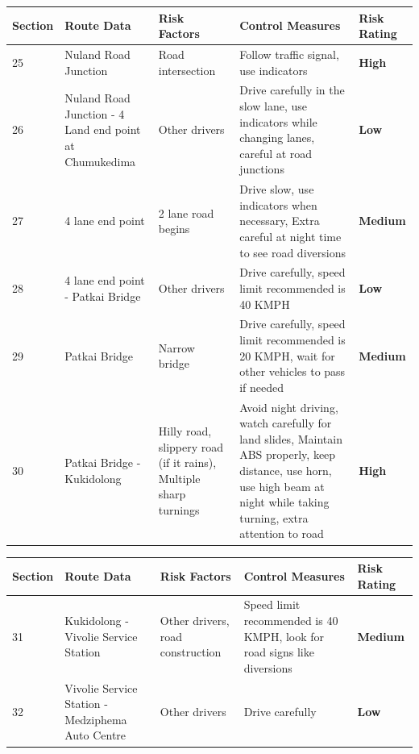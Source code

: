\documentclass[paper=letter, fontsize=12pt]{article}
\begin{document}
\begin{tabular}{ |p{0.5cm}|p{2.5cm}|p{2cm}|p{3cm}|p{1cm}|  }
\hline
Section & Route Data &Risk Factors & Control Measures& Risk Rating \\
\hline

25 & Nuland Road Junction& Road intersection & Follow traffic signal, use indicators& \cellcolor[HTML]{FF0000} \textbf{High}\\
\hline

26 & Nuland Road Junction - 4 Land end point at Chumukedima& Other drivers  & Drive carefully in the slow lane, use indicators while changing lanes, careful at road junctions& \cellcolor[HTML]{00CC00} \textbf{Low}\\
\hline

27 & 4 lane end point&  2 lane road begins & Drive slow, use indicators when necessary, Extra careful at night time to see road diversions & \cellcolor[HTML]{FFCC00} \textbf{Medium}\\
\hline

28 & 4 lane end point - Patkai Bridge&  Other drivers & Drive carefully, speed limit recommended is 40 KMPH & \cellcolor[HTML]{00CC00} \textbf{Low}\\
\hline

29 & Patkai Bridge&  Narrow bridge & Drive carefully, speed limit recommended is 20 KMPH, wait for other vehicles to pass if needed & \cellcolor[HTML]{FFCC00} \textbf{Medium}\\
\hline

30 & Patkai Bridge - Kukidolong & Hilly road, slippery road (if it rains), Multiple sharp turnings & Avoid night driving, watch carefully for land slides, Maintain ABS properly, keep distance, use horn, use high beam at night while taking turning, extra attention to road & \cellcolor[HTML]{FF0000} \textbf{High}\\
\hline


\hline
\end{tabular}


\begin{tabular}{ |p{0.5cm}|p{2.5cm}|p{2cm}|p{3cm}|p{1cm}|  }
\hline
Section & Route Data &Risk Factors & Control Measures& Risk Rating \\
\hline

31 & Kukidolong - Vivolie Service Station &  Other drivers, road construction & Speed limit recommended is 40 KMPH, look for road signs like diversions & \cellcolor[HTML]{FFCC00} \textbf{Medium}\\
\hline

32 & Vivolie Service Station - Medziphema Auto Centre&  Other drivers & Drive carefully& \cellcolor[HTML]{00CC00} \textbf{Low}\\
\hline

\hline
\end{tabular}
\end{document}
